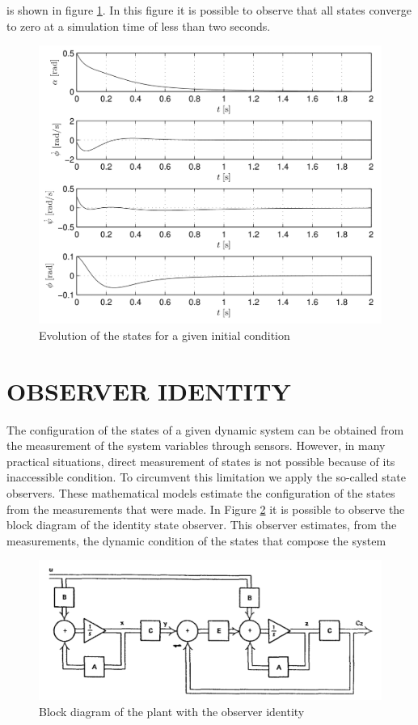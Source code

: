 \documentclass[sublist,a4paper,twoside,11pt]{article}
\begin{document}
is shown in figure \ref{fig:stateevolution}. In this figure it is possible to observe that all states converge to zero at a simulation time of less than two seconds.


\begin{figure}[h]
	\centering
	\includegraphics[width=0.9\linewidth]{figures/StateEvolution}
	\caption{Evolution of the states for a given initial condition}
	\label{fig:stateevolution}
\end{figure}


\section{OBSERVER IDENTITY}
The configuration of the states of a given dynamic system can be obtained from the measurement of the system variables through sensors. However, in many practical situations, direct measurement of states is not possible because of its inaccessible condition. To circumvent this limitation we apply the so-called state observers. These mathematical models estimate the configuration of the states from the measurements that were made. In Figure \ref{fig:observeridentityblockdiagram} it is possible to observe the block diagram of the identity state observer. This observer estimates, from the measurements, the dynamic condition of the states that compose the system 

\begin{figure}
	\centering
	\includegraphics[width=0.7\linewidth]{figures/ObserverIdentityBlockDiagram}
	\caption{Block diagram of the plant with the observer identity}
	\label{fig:observeridentityblockdiagram}
\end{figure}
\end{document}
